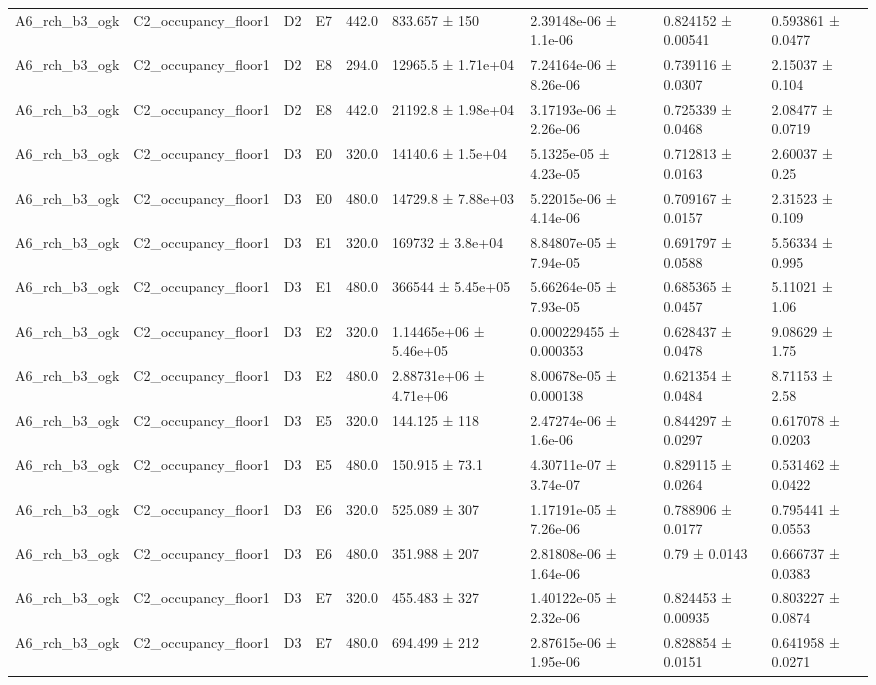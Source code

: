 \begin{table}
\begin{tabular}{lllllllll}
A6\_rch\_b3\_ogk & C2\_occupancy\_floor1 & D2 & E7 & 442.0 & 833.657 ± 150 & 2.39148e-06 ± 1.1e-06 & 0.824152 ± 0.00541 & 0.593861 ± 0.0477 \\
A6\_rch\_b3\_ogk & C2\_occupancy\_floor1 & D2 & E8 & 294.0 & 12965.5 ± 1.71e+04 & 7.24164e-06 ± 8.26e-06 & 0.739116 ± 0.0307 & 2.15037 ± 0.104 \\
A6\_rch\_b3\_ogk & C2\_occupancy\_floor1 & D2 & E8 & 442.0 & 21192.8 ± 1.98e+04 & 3.17193e-06 ± 2.26e-06 & 0.725339 ± 0.0468 & 2.08477 ± 0.0719 \\
A6\_rch\_b3\_ogk & C2\_occupancy\_floor1 & D3 & E0 & 320.0 & 14140.6 ± 1.5e+04 & 5.1325e-05 ± 4.23e-05 & 0.712813 ± 0.0163 & 2.60037 ± 0.25 \\
A6\_rch\_b3\_ogk & C2\_occupancy\_floor1 & D3 & E0 & 480.0 & 14729.8 ± 7.88e+03 & 5.22015e-06 ± 4.14e-06 & 0.709167 ± 0.0157 & 2.31523 ± 0.109 \\
A6\_rch\_b3\_ogk & C2\_occupancy\_floor1 & D3 & E1 & 320.0 & 169732 ± 3.8e+04 & 8.84807e-05 ± 7.94e-05 & 0.691797 ± 0.0588 & 5.56334 ± 0.995 \\
A6\_rch\_b3\_ogk & C2\_occupancy\_floor1 & D3 & E1 & 480.0 & 366544 ± 5.45e+05 & 5.66264e-05 ± 7.93e-05 & 0.685365 ± 0.0457 & 5.11021 ± 1.06 \\
A6\_rch\_b3\_ogk & C2\_occupancy\_floor1 & D3 & E2 & 320.0 & 1.14465e+06 ± 5.46e+05 & 0.000229455 ± 0.000353 & 0.628437 ± 0.0478 & 9.08629 ± 1.75 \\
A6\_rch\_b3\_ogk & C2\_occupancy\_floor1 & D3 & E2 & 480.0 & 2.88731e+06 ± 4.71e+06 & 8.00678e-05 ± 0.000138 & 0.621354 ± 0.0484 & 8.71153 ± 2.58 \\
A6\_rch\_b3\_ogk & C2\_occupancy\_floor1 & D3 & E5 & 320.0 & 144.125 ± 118 & 2.47274e-06 ± 1.6e-06 & 0.844297 ± 0.0297 & 0.617078 ± 0.0203 \\
A6\_rch\_b3\_ogk & C2\_occupancy\_floor1 & D3 & E5 & 480.0 & 150.915 ± 73.1 & 4.30711e-07 ± 3.74e-07 & 0.829115 ± 0.0264 & 0.531462 ± 0.0422 \\
A6\_rch\_b3\_ogk & C2\_occupancy\_floor1 & D3 & E6 & 320.0 & 525.089 ± 307 & 1.17191e-05 ± 7.26e-06 & 0.788906 ± 0.0177 & 0.795441 ± 0.0553 \\
A6\_rch\_b3\_ogk & C2\_occupancy\_floor1 & D3 & E6 & 480.0 & 351.988 ± 207 & 2.81808e-06 ± 1.64e-06 & 0.79 ± 0.0143 & 0.666737 ± 0.0383 \\
A6\_rch\_b3\_ogk & C2\_occupancy\_floor1 & D3 & E7 & 320.0 & 455.483 ± 327 & 1.40122e-05 ± 2.32e-06 & 0.824453 ± 0.00935 & 0.803227 ± 0.0874 \\
A6\_rch\_b3\_ogk & C2\_occupancy\_floor1 & D3 & E7 & 480.0 & 694.499 ± 212 & 2.87615e-06 ± 1.95e-06 & 0.828854 ± 0.0151 & 0.641958 ± 0.0271 \\

\end{tabular}
\end{table}

